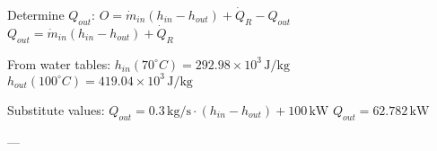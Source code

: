 Determine \( Q_{out} \):  
\( O = \dot{m}_{in} (h_{in} - h_{out}) + \dot{Q}_R - Q_{out} \)  
\( Q_{out} = \dot{m}_{in} (h_{in} - h_{out}) + \dot{Q}_R \)  

From water tables:  
\( h_{in} (70^\circ C) = 292.98 \times 10^3 \, \text{J/kg} \)  
\( h_{out} (100^\circ C) = 419.04 \times 10^3 \, \text{J/kg} \)  

Substitute values:  
\( Q_{out} = 0.3 \, \text{kg/s} \cdot (h_{in} - h_{out}) + 100 \, \text{kW} \)  
\( Q_{out} = 62.782 \, \text{kW} \)  

---